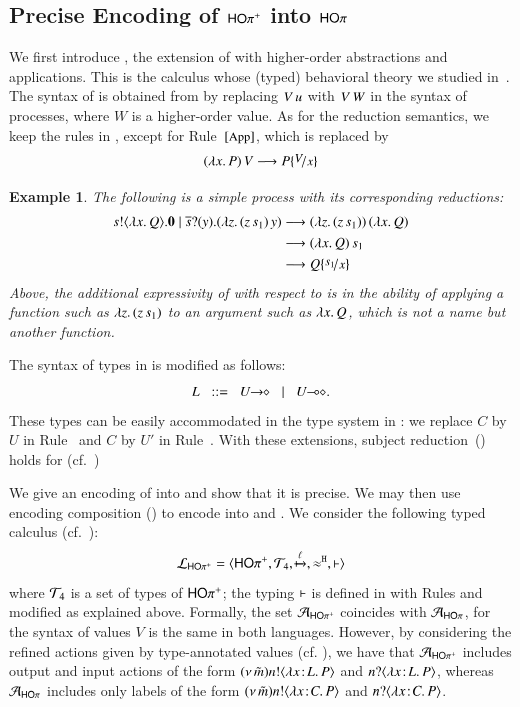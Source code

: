 \documentclass[preprint,11pt]{elsarticle}
\newtheorem{example}{Example}[section]
\begin{document}
{%
\subsection{Precise Encoding of $\mathsf{HO\pi^{+}}$ into $\mathsf{HO}\pi$}
We first introduce \HOpp, the  extension of \HOp with higher-order abstractions and applications.
This is the calculus whose (typed) behavioral theory we studied in~\cite{characteristic_bis,KouzapasPY17}. The syntax of \HOpp is obtained 
from   by replacing 
$V\, {u}$ with  $V\, {W}$ in the syntax of processes, where  $W$ is a higher-order value. 
As for the reduction semantics, we keep the rules in , except for 
 Rule~${\scriptsize{[\textrm{\small App}]}}$, which is replaced by 
$$
	\appl{(\abs{x}{P})}{V} \red P \subst{V}{x}
$$

\begin{example}\label{ex:hopp}
The following is a simple \HOpp process with its corresponding reductions:
\begin{align*}
\bout{s}{\abs{x}{Q}}\inact  \Par \binp{\dual{s}}{y}(\appl{\abs{z}{(\appl{z}{s_1}})}{y}) 
& \red 
\appl{(\abs{z}{(\appl{z}{s_1}}))}{(\abs{x}{Q})}
\\
& \red 
\appl{(\abs{x}{Q})}{s_1}
\\
& \red Q\subst{s_1}{x}
\end{align*}
Above, the additional expressivity of \HOpp with respect to \HOp is in the ability of applying a function such as 
$\lambda z.\,(z\, {s_1})$ to an argument such as $\lambda x.\,Q$, which is not a name but another function.
\end{example}


		The syntax of types in  is modified as follows: %
$$
		L \bnfis \shot{U} \bnfbar \lhot{U}.
$$
These types can be easily accommodated in the type system 
in :
we replace $C$ by $U$ in Rule~ and $C$ by $U'$ in Rule~. 
With these extensions, subject
reduction~() holds for \HOpp (cf.~\cite{characteristic_bis})

We give  %
an encoding of \HOpp into \HOp and show that it is precise. 
We may then use encoding composition () to encode
\HOpp into \HO and \sessp.
We consider the following 
typed calculus (cf.~):
$$\mathcal{L}_{\mathsf{HO\pi^{+}}}=\langle \mathsf{HO\pi^{+}}, {\cal{T}}_4, \xmapsto{\ell}, \approx^\mathtt{H}, \vdash \rangle$$
where 
	${\cal{T}}_4$ is a set of types of $\mathsf{HO\pi^{+}}$;  
the typing $\vdash$ is defined in 
with Rules  and  modified as explained above.
Formally, the set   
$\mathcal{A}_\mathsf{HO\pi^{+}}$ coincides with $\mathcal{A}_{\mathsf{HO}\pi}$, for the syntax of values $V$ is the same in both languages.
However, by considering the refined actions given by type-annotated values (cf. ),
we have that   $\mathcal{A}_\mathsf{HO\pi^{+}}$
includes output and input actions of the form
$(\nu\, \tilde{m}) n ! \langle \lambda x \! : \! L.\,P \rangle$
and
${n ? \langle \lambda x \! : \! L.\,P \rangle}$, whereas $\mathcal{A}_{\mathsf{HO}\pi}$ includes only labels of the form
$(\nu\, \tilde{m}) n ! \langle \lambda x \! : \! C.\,P \rangle$
and
${n ? \langle \lambda x \! : \! C.\,P \rangle}$.

}
\end{document}
